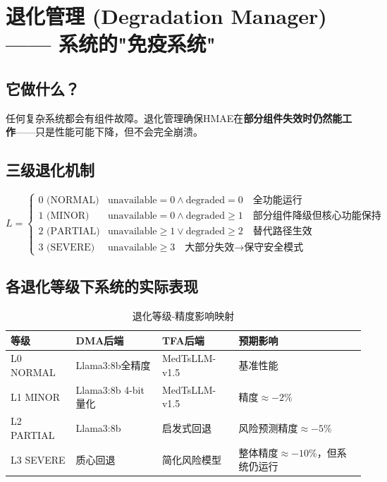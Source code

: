\documentclass[11pt,a4paper]{ctexart}
\begin{document}
\newpage

\section{退化管理 (Degradation Manager) —— 系统的"免疫系统"}

\subsection{它做什么？}

任何复杂系统都会有组件故障。退化管理确保HMAE在\textbf{部分组件失效时仍然能工作}——只是性能可能下降，但不会完全崩溃。

\subsection{三级退化机制}

\begin{defbox}[退化等级]
$$L = \begin{cases}
0 \text{ (NORMAL)} & \text{unavailable} = 0 \land \text{degraded} = 0 \quad \text{全功能运行}\\
1 \text{ (MINOR)} & \text{unavailable} = 0 \land \text{degraded} \geq 1 \quad \text{部分组件降级但核心功能保持}\\
2 \text{ (PARTIAL)} & \text{unavailable} \geq 1 \lor \text{degraded} \geq 2 \quad \text{替代路径生效}\\
3 \text{ (SEVERE)} & \text{unavailable} \geq 3 \quad \text{大部分失效→保守安全模式}
\end{cases}$$
\end{defbox}

\subsection{各退化等级下系统的实际表现}

\begin{table}[H]
\centering
\small
\begin{tabular}{lllp{5cm}}
\toprule
\textbf{等级} & \textbf{DMA后端} & \textbf{TFA后端} & \textbf{预期影响} \\
\midrule
L0 NORMAL & Llama3:8b全精度 & MedTsLLM-v1.5 & 基准性能 \\
L1 MINOR & Llama3:8b 4-bit量化 & MedTsLLM-v1.5 & 精度$\approx -2\%$ \\
L2 PARTIAL & Llama3:8b & 启发式回退 & 风险预测精度$\approx -5\%$ \\
L3 SEVERE & 质心回退 & 简化风险模型 & 整体精度$\approx -10\%$，但系统仍运行 \\
\bottomrule
\end{tabular}
\caption{退化等级-精度影响映射}
\end{table}
\end{document}

